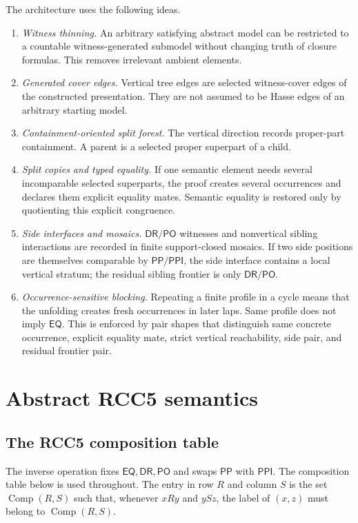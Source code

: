 \documentclass[11pt]{article}
\newcommand{\EQ}{\mathsf{EQ}}
\newcommand{\DR}{\mathsf{DR}}
\newcommand{\PO}{\mathsf{PO}}
\newcommand{\PP}{\mathsf{PP}}
\newcommand{\PPI}{\mathsf{PPI}}
\newcommand{\comp}{\operatorname{Comp}}
\begin{document}
The architecture uses the following ideas.
\begin{enumerate}[label=(A\arabic*)]
\item \emph{Witness thinning.}  An arbitrary satisfying abstract model can be restricted to a countable witness-generated submodel without changing truth of closure formulas.  This removes irrelevant ambient elements.
\item \emph{Generated cover edges.}  Vertical tree edges are selected witness-cover edges of the constructed presentation.  They are not assumed to be Hasse edges of an arbitrary starting model.
\item \emph{Containment-oriented split forest.}  The vertical direction records proper-part containment.  A parent is a selected proper superpart of a child.
\item \emph{Split copies and typed equality.}  If one semantic element needs several incomparable selected superparts, the proof creates several occurrences and declares them explicit equality mates.  Semantic equality is restored only by quotienting this explicit congruence.
\item \emph{Side interfaces and mosaics.}  $\DR/\PO$ witnesses and nonvertical sibling interactions are recorded in finite support-closed mosaics.  If two side positions are themselves comparable by $\PP/\PPI$, the side interface contains a local vertical stratum; the residual sibling frontier is only $\DR/\PO$.
\item \emph{Occurrence-sensitive blocking.}  Repeating a finite profile in a cycle means that the unfolding creates fresh occurrences in later laps.  Same profile does not imply $\EQ$.  This is enforced by pair shapes that distinguish same concrete occurrence, explicit equality mate, strict vertical reachability, side pair, and residual frontier pair.
\end{enumerate}

\section{Abstract RCC5 semantics}

\subsection{The RCC5 composition table}

The inverse operation fixes $\EQ,\DR,\PO$ and swaps $\PP$ with $\PPI$.  The composition table below is used throughout.  The entry in row $R$ and column $S$ is the set $\comp(R,S)$ such that, whenever $xRy$ and $ySz$, the label of $(x,z)$ must belong to $\comp(R,S)$.
\end{document}
